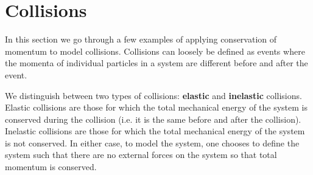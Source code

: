 \section{Collisions}
In this section we go through a few examples of applying conservation of momentum to model collisions. Collisions can loosely be defined as events where the momenta of individual particles in a system are different before and after the event.

We distinguish between two types of collisions: \textbf{elastic} and \textbf{inelastic} collisions. Elastic collisions are those for which the total mechanical energy of the system is conserved during the collision (i.e. it is the same before and after the collision). Inelastic collisions are those for which the total mechanical energy of the system is not conserved. In either case, to model the system, one chooses to define the system such that there are no external forces on the system so that total momentum is conserved.

